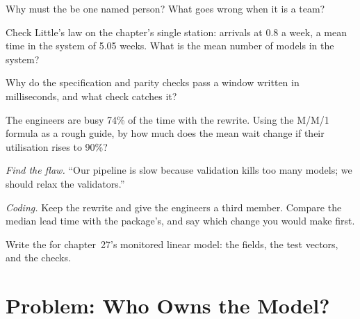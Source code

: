 \begin{exercise}[$\star$]\label{exo:ml:the-machine-learning-team:2}
Why must the  be one named person? What goes wrong when it is a team?
\end{exercise}

\begin{exercise}[$\star$]\label{exo:ml:the-machine-learning-team:3}
Check Little's law on the chapter's single station: arrivals at 0.8 a week, a mean time in the system of 5.05 weeks. What is
the mean number of models in the system?
\end{exercise}

\begin{exercise}[$\star\star$]\label{exo:ml:the-machine-learning-team:4}
Why do the specification and parity checks pass a window written in milliseconds, and what check catches it?
\end{exercise}

\begin{exercise}[$\star\star$]\label{exo:ml:the-machine-learning-team:5}
The engineers are busy 74\% of the time with the rewrite. Using the M/M/1 formula as a rough guide, by how much does the mean
wait change if their utilisation rises to 90\%?
\end{exercise}

\begin{exercise}[$\star\star$]\label{exo:ml:the-machine-learning-team:6}
\emph{Find the flaw.} ``Our pipeline is slow because validation kills too many models; we should relax the validators.''
\end{exercise}

\begin{exercise}[$\star\star\star$]\label{exo:ml:the-machine-learning-team:7}
\emph{Coding.} Keep the rewrite and give the engineers a third member. Compare the median lead time with the package's, and
say which change you would make first.
\end{exercise}

\begin{exercise}[$\star\star\star$]\label{exo:ml:the-machine-learning-team:8}
Write the  for chapter~27's monitored linear model: the fields, the test vectors, and the checks.
\end{exercise}

\section{Problem: Who Owns the Model?}

